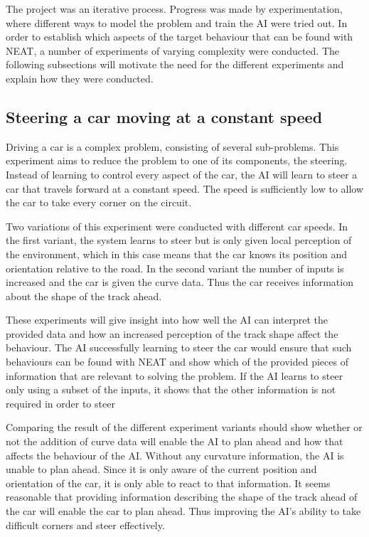 The project was an iterative process. Progress was made by experimentation, where different ways to model the problem and train the AI were tried out. In order to establish which aspects of the target behaviour that can be found with NEAT, a number of experiments of varying complexity were conducted. The following subsections will motivate the need for the different experiments and explain how they were conducted. 

\subsection{Steering a car moving at a constant speed}

Driving a car is a complex problem, consisting of several sub-problems. This experiment aims to reduce the problem to one of its components, the steering. Instead of learning to control every aspect of the car, the AI will learn to steer a car that travels forward at a constant speed. The speed is sufficiently low to allow the car to take every corner on the circuit. 


Two variations of this experiment were conducted with different car speeds. In the first variant, the system learns to steer but is only given local perception of the environment, which in this case means that the car knows its position and orientation relative to the road. In the second variant the number of inputs is increased and the car is given the curve data. Thus the car receives information about the shape of the track ahead.

These experiments will give insight into how well the AI can interpret the provided data and how an increased perception of the track shape affect the behaviour. The AI successfully learning to steer the car would ensure that such behaviours can be found with NEAT and show which of the provided pieces of information that are relevant to solving the problem. If the AI learns to steer only using a subset of the inputs, it shows that the other information is not required in order to steer

Comparing the result of the different experiment variants should show whether or not the addition of curve data will enable the AI to plan ahead and how that affects the behaviour of the AI. Without any curvature information, the AI is unable to plan ahead. Since it is only aware of the current position and orientation of the car, it is only able to react to that information. It seems reasonable that providing information describing the shape of the track ahead of the car will enable the car to plan ahead. Thus improving the AI's ability to take difficult corners and steer effectively. 


